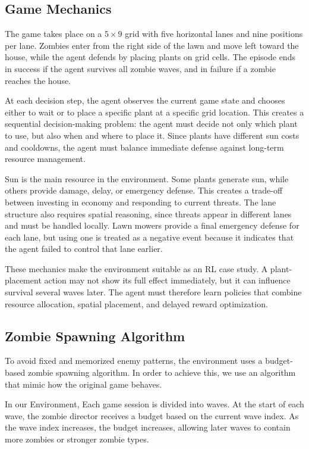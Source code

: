 \documentclass[conference,onecolumn]{IEEEtran}
\begin{document}
\subsection{Game Mechanics}

The game takes place on a $5 \times 9$ grid with five horizontal lanes and nine positions per lane. Zombies enter from the right side of the lawn and move left toward the house, while the agent defends by placing plants on grid cells. The episode ends in success if the agent survives all zombie waves, and in failure if a zombie reaches the house.

At each decision step, the agent observes the current game state and chooses either to wait or to place a specific plant at a specific grid location. This creates a sequential decision-making problem: the agent must decide not only which plant to use, but also when and where to place it. Since plants have different sun costs and cooldowns, the agent must balance immediate defense against long-term resource management.

Sun is the main resource in the environment. Some plants generate sun, while others provide damage, delay, or emergency defense. This creates a trade-off between investing in economy and responding to current threats. The lane structure also requires spatial reasoning, since threats appear in different lanes and must be handled locally. Lawn mowers provide a final emergency defense for each lane, but using one is treated as a negative event because it indicates that the agent failed to control that lane earlier.

These mechanics make the environment suitable as an RL case study. A plant-placement action may not show its full effect immediately, but it can influence survival several waves later. The agent must therefore learn policies that combine resource allocation, spatial placement, and delayed reward optimization.

\subsection{Zombie Spawning Algorithm}

To avoid fixed and memorized enemy patterns, the environment uses a budget-based zombie spawning algorithm. In order to achieve this, we use an algorithm that mimic how the original game behaves. 

In our Environment, Each game session is divided into waves. At the start of each wave, the zombie director receives a budget based on the current wave index. As the wave index increases, the budget increases, allowing later waves to contain more zombies or stronger zombie types.
\end{document}
